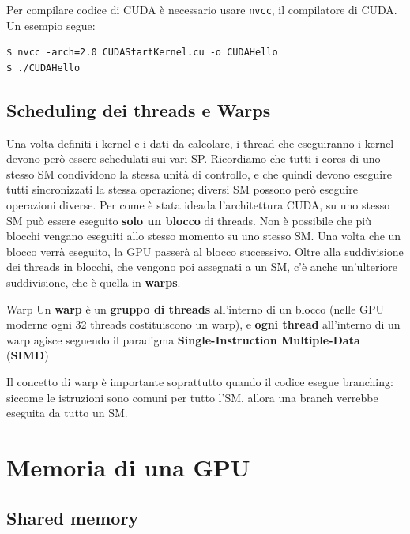 Per compilare codice di CUDA è necessario usare \verb|nvcc|, il compilatore di CUDA. Un esempio segue:

\begin{terminal}
    \begin{lstlisting}[style = notexterm]
$ nvcc -arch=2.0 CUDAStartKernel.cu -o CUDAHello
$ ./CUDAHello\end{lstlisting}
\end{terminal}

\subsection{Scheduling dei threads e Warps}

Una volta definiti i kernel e i dati da calcolare, i thread che eseguiranno i kernel devono però essere schedulati sui vari SP. Ricordiamo che tutti i cores di uno stesso SM condividono la stessa unità di controllo, e che quindi devono eseguire tutti sincronizzati la stessa operazione; diversi SM possono però eseguire operazioni diverse.
\nwl
Per come è stata ideada l'architettura CUDA, su uno stesso SM può essere eseguito \textbf{solo un blocco} di threads. Non è possibile che più blocchi vengano eseguiti allo stesso momento su uno stesso SM. Una volta che un blocco verrà eseguito, la GPU passerà al blocco successivo.
\nwl
Oltre alla suddivisione dei threads in blocchi, che vengono poi assegnati a un SM, c'è anche un'ulteriore suddivisione, che è quella in \textbf{warps}.

\begin{definition}{Warp}
    Un \textbf{warp} è un \textbf{gruppo di threads} all'interno di un blocco (nelle GPU moderne ogni 32 threads costituiscono un warp), e \textbf{ogni thread} all'interno di un warp agisce seguendo il paradigma \textbf{Single-Instruction Multiple-Data} (\textbf{SIMD})
\end{definition}

Il concetto di warp è importante soprattutto quando il codice esegue branching: siccome le istruzioni sono comuni per tutto l'SM, allora una branch verrebbe eseguita da tutto un SM. 

\section{Memoria di una GPU}


\subsection{Shared memory}

